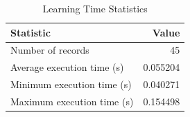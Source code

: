 
\begin{table}[h!]
\centering
\begin{tabular}{l r}
\hline
Statistic & Value \\
\hline
Number of records & 45 \\
Average execution time (s) & 0.055204 \\
Minimum execution time (s) & 0.040271 \\
Maximum execution time (s) & 0.154498 \\
\hline
\end{tabular}
\caption{Learning Time Statistics}
\end{table}
